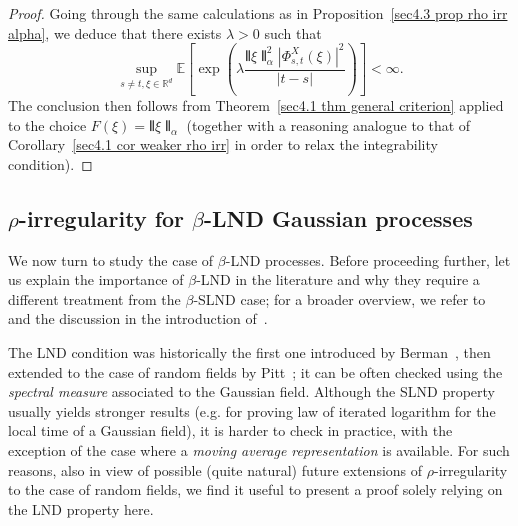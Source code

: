 \documentclass[10pt]{article}
\newcommand{\tmtextit}[1]{{\itshape{#1}}}
\begin{document}
\begin{proof}
  Going through the same calculations as in Proposition~\ref{sec4.3 prop rho
  irr alpha}, we deduce that there exists $\lambda > 0$ such that
  \[ \sup_{s \neq t, \xi \in \mathbb{R}^d} \mathbb{E} \left[ \exp \left(
     \lambda \frac{\interleave \xi \interleave_{\alpha}^2  | \Phi^X_{s, t}
     (\xi) |^2}{| t - s |} \right) \right] < \infty . \]
  The conclusion then follows from Theorem~\ref{sec4.1 thm general criterion}
  applied to the choice $F (\xi) = \interleave \xi \interleave_{\alpha}$
  (together with a reasoning analogue to that of Corollary~\ref{sec4.1 cor
  weaker rho irr} in order to relax the integrability condition).
\end{proof}

\subsection{$\rho$\mbox{-}irregularity for $\beta$\mbox{-}LND Gaussian
processes}\label{sec4.4}

We now turn to study the case of $\beta$\mbox{-}LND processes. Before
proceeding further, let us explain the importance of $\beta$-LND in the
literature and why they require a different treatment from the
$\beta$\mbox{-}SLND case; for a broader overview, we refer
to~{\cite{geman,xiao}} and the discussion in the introduction
of~{\cite{xiao2007}}.

The LND condition was historically the first one introduced by
Berman~{\cite{berman73}}, then extended to the case of random fields by
Pitt~{\cite{pitt}}; it can be often checked using the \tmtextit{spectral
measure} associated to the Gaussian field. Although the SLND property usually
yields stronger results (e.g. for proving law of iterated logarithm for the
local time of a Gaussian field), it is harder to check in practice, with the
exception of the case where a \tmtextit{moving average representation} is
available. For such reasons, also in view of possible (quite natural) future
extensions of $\rho$-irregularity to the case of random fields, we find it
useful to present a proof solely relying on the LND property here.
\end{document}
